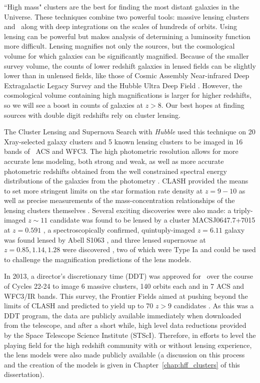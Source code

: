 ``High mass" clusters are the best for finding the most distant galaxies in the Universe. These techniques combine two powerful tools: massive lensing clusters and \hst\ along with deep integrations on the scales of hundreds of orbits. Using lensing can be powerful but makes analysis of determining a luminosity function more difficult. Lensing magnifies not only the sources, but the cosmological volume for which galaxies can be significantly magnified. Because of the smaller survey volume, the counts of lower redshift galaxies in lensed fields can be slightly lower than in unlensed fields, like those of Cosmic Assembly Near-infrared Deep Extragalactic Legacy Survey \citep[CANDELS; ][]{Grogin:2011ly} and the Hubble Ultra Deep Field \citep{Beckwith:2006rt}. However, the cosmological volume containing high magnifications is larger for higher redshifts, so we will see a boost in counts of galaxies at $z>8$. Our best hopes at finding sources with double digit redshifts rely on cluster lensing.

The Cluster Lensing and Supernova Search with {\it Hubble} \citep[CLASH; ][]{Postman:2012lr} used this technique on 20 Xray-selected galaxy clusters and 5 known lensing clusters to be imaged in 16 bands of \hst\ ACS and WFC3. The high photometric resolution allows for more accurate lens modeling, both strong and weak, as well as more accurate photometric redshifts obtained from the well constrained spectral energy distributions of the galaxies from the photometry \citep{Jouvel:2014qy}. CLASH provided the means to set more stringent limits on the star formation rate density at $z=9-10$ \citep{Bouwens:2014zp} as well as precise measurements of the mass-concentration relationships of the lensing clusters themselves \citep{Merten:2015rz,Meneghetti:2014ys}. Several exciting discoveries were also made: a triply-imaged $z\sim11$ candidate was found to be lensed by a cluster MACSJ0647.7+7015 at $z = 0.591$ \citep{Coe:2013tg}, a spectroscopically confirmed, quintuply-imaged $z=6.11$ galaxy was found lensed by Abell S1063 \citep{Monna:2014lr,Balestra:2013uq}, and three lensed supernovae at $z=0.85,1.14,1.28$ were discovered \citep{Patel:2014kl}, two of which were Type Ia and could be used to challenge the magnification predictions of the lens models.

In 2013, a director's discretionary time (DDT) was approved for \hst\ over the course of Cycles 22-24 to image 6 massive clusters, 140 orbits each and in 7 ACS and WFC3/IR bands. This survey, the Frontier Fields \citep{Lotz:2017gd} aimed at pushing beyond the limits of CLASH and predicted to yield up to 70 $z>9$ candidates \citep{Coe:2015qf}. As this was a DDT program, the data are publicly available immediately when downloaded from the telescope, and after a short while, high level data reductions provided by the Space Telescope Science Institute (STScI). Therefore, in efforts to level the playing field for the high redshift community with or without lensing experience, the lens models were also made publicly available (a discussion on this process and the creation of the models is given in Chapter~\ref{chap:hff_clusters} of this dissertation).

